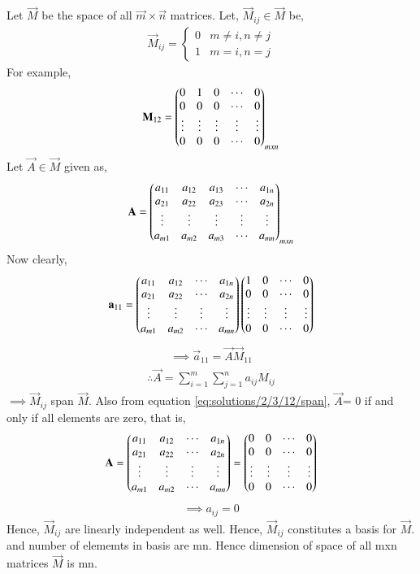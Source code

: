 Let $\vec{M}$ be the space of all $\vec{m}\times\vec{n}$ matrices. Let, $\vec{M}_{ij} \in \vec{M}$ be,
\begin{align}
\vec{M}_{ij} = \begin{cases} 0 &  m\neq i, n\neq j \\ 1 & m=i,n=j \end{cases}
\end{align}
For example,
\begin{align}
\mathbf{M}_{12} = \begin{pmatrix}0&1&0&\cdots&0\\0&0&0&\cdots&0\\\vdots&\vdots&\vdots&\vdots&\vdots\\0&0&0&\cdots&0\end{pmatrix}_{mxn}\\
\end{align}
Let $\vec{A} \in \vec{M}$ given as,
\begin{align}
\mathbf{A} = \begin{pmatrix}a_{11}&a_{12}&a_{13}&\cdots&a_{1n}\\a_{21}&a_{22}&a_{23}&\cdots&a_{2n}\\\vdots&\vdots&\vdots&\vdots&\vdots\\a_{m1}&a_{m2}&a_{m3}&\cdots&a_{mn}\end{pmatrix}_{mxn}
\end{align}
Now clearly,
\begin{align}
\mathbf{a}_{11} = \begin{pmatrix}a_{11}&a_{12}&\cdots&a_{1n}\\a_{21}&a_{22}&\cdots&a_{2n}\\\vdots&\vdots&\vdots&\vdots\\a_{m1}&a_{m2}&\cdots&a_{mn}\end{pmatrix} \begin{pmatrix}1&0&\cdots&0\\0&0&\cdots&0\\\vdots&\vdots&\vdots&\vdots\\0&0&\cdots&0\end{pmatrix}
\end{align}
\begin{align}
\implies \vec{a}_{11} = \vec{A}\vec{M}_{11}
\end{align}
\begin{align}
\therefore\vec{A} = \sum_{i=1}^{m} \sum_{j=1}^{n} a_{ij}M_{ij} \label{eq:solutions/2/3/12/span}
\end{align}
$\implies \vec{M}_{ij}$ span $\vec{M}$. 
Also from equation \eqref{eq:solutions/2/3/12/span}, $\vec{A}$=  0 if and only if all elements are zero, that is, 
\begin{align}
\mathbf{A} = \begin{pmatrix}a_{11}&a_{12}&\cdots&a_{1n}\\a_{21}&a_{22}&\cdots&a_{2n}\\\vdots&\vdots&\vdots&\vdots\\a_{m1}&a_{m2}&\cdots&a_{mn}\end{pmatrix}= \begin{pmatrix}0&0&\cdots&0\\0&0&\cdots&0\\\vdots&\vdots&\vdots&\vdots\\0&0&\cdots&0\end{pmatrix}
\end{align}
\begin{align}
\implies a_{ij} = 0
\end{align}
Hence, $\vec{M}_{ij}$ are linearly independent as well. Hence, $\vec{M}_{ij}$ constitutes a basis for $\vec{M}$. and number of elememts in basis are mn. Hence dimension of space of all mxn matrices $\vec{M}$ is mn. 
